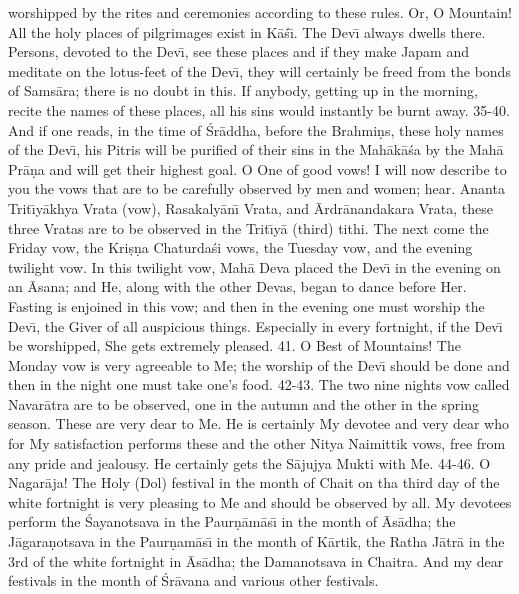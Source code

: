 worshipped by the rites and ceremonies according to these rules. Or, O Mountain! All the holy places of pilgrimages exist in K\=a\'s\={\i}. The Dev\={\i} always dwells there. Persons, devoted to the Dev\={\i}, see these places and if they make Japam and meditate on the lotus-feet of the Dev\={\i}, they will certainly be freed from the bonds of Sams\=ara; there is no doubt in this. If anybody, getting up in the morning, recite the names of these places, all his sins would instantly be burnt away.
35-40. And if one reads, in the time of \'Sr\=addha, before the Brahmi\d{n}s, these holy names of the Dev\={\i}, his Pitris will be purified of their sins in the Mah\=ak\=a\'sa by the Mah\=a Pr\=a\d{n}a and will get their highest goal. O One of good vows! I will now describe to you the vows that are to be carefully observed by men and women; hear. Ananta Trit\={\i}y\=akhya Vrata (vow), Rasakaly\=an\={\i} Vrata, and \=Ardr\=anandakara Vrata, these three Vratas are to be observed in the Trit\={\i}y\=a (third) tithi. The next come the Friday vow, the Kri\d{s}\d{n}a Chaturda\'si vows, the Tuesday vow, and the evening twilight vow. In this twilight vow, Mah\=a Deva placed the Dev\={\i} in the evening on an \=Asana; and He, along with the other Devas, began to dance before Her. Fasting is enjoined in this vow; and then in the evening one must worship the Dev\={\i}, the Giver of all auspicious things. Especially in every fortnight, if the Dev\={\i} be worshipped, She gets extremely pleased.
41. O Best of Mountains! The Monday vow is very agreeable to Me; the worship of the Dev\={\i} should be done and then in the night one must take one's food.
42-43. The two nine nights vow called Navar\=atra are to be observed, one in the autumn and the other in the spring season. These are very dear to Me. He is certainly My devotee and very dear who for My satisfaction performs these and the other Nitya Naimittik vows, free from any pride and jealousy. He certainly gets the S\=ajujya Mukti with Me.
44-46. O Nagar\=aja! The Holy (Dol) festival in the month of Chait on tha third day of the white fortnight is very pleasing to Me and should be observed by all. My devotees perform the \'Sayanotsava in the Paur\d{n}\=am\=as\={\i} in the month of \=As\=adha; the J\=agara\d{n}otsava in the Paur\d{n}am\=as\={\i} in the month of K\=artik, the Ratha J\=atr\=a in the 3rd of the white fortnight in \=As\=adha; the Damanotsava in Chaitra. And my dear festivals in the month of \'Sr\=avana and various other festivals.

